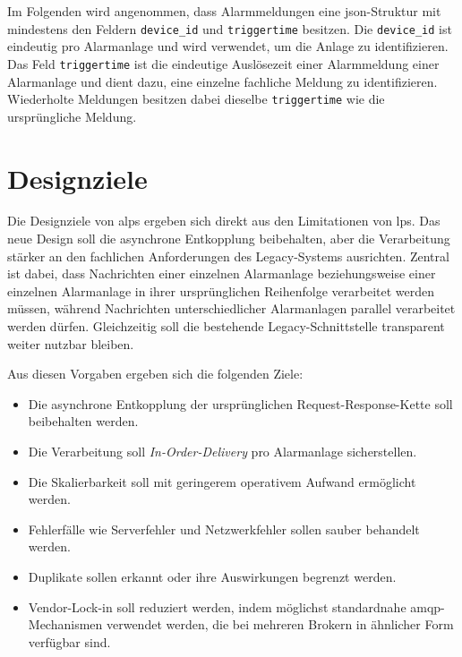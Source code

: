 Im Folgenden wird angenommen, dass Alarmmeldungen eine \gls{json}-Struktur mit mindestens den Feldern \texttt{device\_id} und \texttt{triggertime} besitzen. \newline Die \texttt{device\_id} ist eindeutig pro Alarmanlage und wird verwendet, um die Anlage zu identifizieren. Das Feld \texttt{triggertime} ist die eindeutige Auslösezeit einer Alarmmeldung einer Alarmanlage und dient dazu, eine einzelne fachliche Meldung zu identifizieren. Wiederholte Meldungen besitzen dabei dieselbe \texttt{triggertime} wie die ursprüngliche Meldung.

\section{Designziele}

Die Designziele von \gls{alps} ergeben sich direkt aus den Limitationen von \gls{lps}. Das neue Design soll die asynchrone Entkopplung beibehalten, aber die Verarbeitung stärker an den fachlichen Anforderungen des Legacy-Systems ausrichten. Zentral ist dabei, dass Nachrichten einer einzelnen Alarmanlage beziehungsweise einer einzelnen Alarmanlage in ihrer ursprünglichen Reihenfolge verarbeitet werden müssen, während Nachrichten unterschiedlicher Alarmanlagen parallel verarbeitet werden dürfen. Gleichzeitig soll die bestehende Legacy-Schnittstelle transparent weiter nutzbar bleiben.

Aus diesen Vorgaben ergeben sich die folgenden Ziele:
\begin{itemize}
    \item Die asynchrone Entkopplung der ursprünglichen Request-Response-Kette soll beibehalten werden.
    \item Die Verarbeitung soll \textit{In-Order-Delivery} pro Alarmanlage sicherstellen.
    \item Die Skalierbarkeit soll mit geringerem operativem Aufwand ermöglicht werden.
    \item Fehlerfälle wie Serverfehler und Netzwerkfehler sollen sauber behandelt werden.
    \item Duplikate sollen erkannt oder ihre Auswirkungen begrenzt werden.
    \item Vendor-Lock-in soll reduziert werden, indem möglichst standardnahe \gls{amqp}-Mechanismen verwendet werden, die bei mehreren Brokern in ähnlicher Form verfügbar sind.
\end{itemize}

